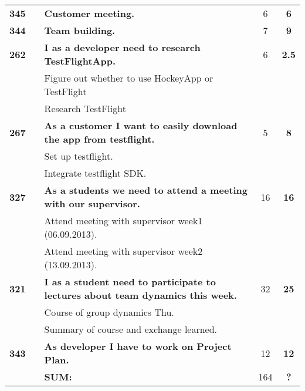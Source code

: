 \begin{longtable}{ccXcc}
		
\midrule
				

\textbf{345} 	&& {\bf Customer meeting.} 	& 		6	& \textbf{6} \\

\textbf{344} 	&& {\bf Team building.} 	& 		7	& \textbf{9} \\


\textbf{262} 	&& {\bf I as a developer need to research TestFlightApp. } 	& 		6	& \textbf{2.5} \\
				&& Figure out whether to use HockeyApp or TestFlight&  &  \\
				&& Research TestFlight	&  &  \\
				
			
\textbf{267} 	&& {\bf As a customer I want to easily download the app from testflight. } 	& 		5	& \textbf{8} \\
				&& Set up testflight.	&  &  \\
				&& Integrate testflight SDK. &  &  \\

		
\textbf{327} 	&& {\bf As a students we need to attend a meeting with our supervisor. } 	& 		16	& \textbf{16} \\
				&& Attend meeting with supervisor week1 (06.09.2013).	&  &  \\
				&& Attend meeting with supervisor week2 (13.09.2013).	&  &  \\

\midrule
\textbf{321} 	&& {\bf I as a student need to participate to lectures about team dynamics this week. } 	& 		32	& \textbf{25} \\
				&& Course of group dynamics Thu.	&  &  \\
				&& Summary of course and exchange learned.	&  &  \\
				
\textbf{343} 	&& {\bf As developer I have to work on Project Plan.} 	& 		12	& \textbf{12} \\
				
\hline
				&& \textbf{SUM:}		&		164	& \textbf{?}
 \\																			
\bottomrule[1mm]
\end{longtable}
